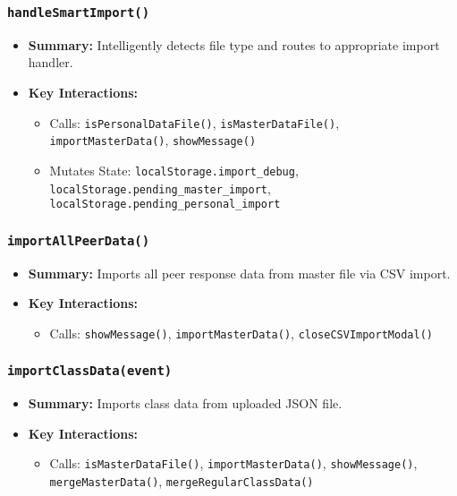 \documentclass[11pt,letterpaper]{article}
\begin{document}
\subsubsection{\texttt{handleSmartImport()}}
\begin{itemize}
    \item \textbf{Summary:} Intelligently detects file type and routes to appropriate import handler.
    \item \textbf{Key Interactions:}
    \begin{itemize}
        \item Calls: \texttt{isPersonalDataFile()}, \texttt{isMasterDataFile()}, \texttt{importMasterData()}, \texttt{showMessage()}
        \item Mutates State: \texttt{localStorage.import\_debug}, \texttt{localStorage.pending\_master\_import}, \texttt{localStorage.pending\_personal\_import}
    \end{itemize}
\end{itemize}

\subsubsection{\texttt{importAllPeerData()}}
\begin{itemize}
    \item \textbf{Summary:} Imports all peer response data from master file via CSV import.
    \item \textbf{Key Interactions:}
    \begin{itemize}
        \item Calls: \texttt{showMessage()}, \texttt{importMasterData()}, \texttt{closeCSVImportModal()}
    \end{itemize}
\end{itemize}

\subsubsection{\texttt{importClassData(event)}}
\begin{itemize}
    \item \textbf{Summary:} Imports class data from uploaded JSON file.
    \item \textbf{Key Interactions:}
    \begin{itemize}
        \item Calls: \texttt{isMasterDataFile()}, \texttt{importMasterData()}, \texttt{showMessage()}, \texttt{mergeMasterData()}, \texttt{mergeRegularClassData()}
    \end{itemize}
\end{itemize}
\end{document}
